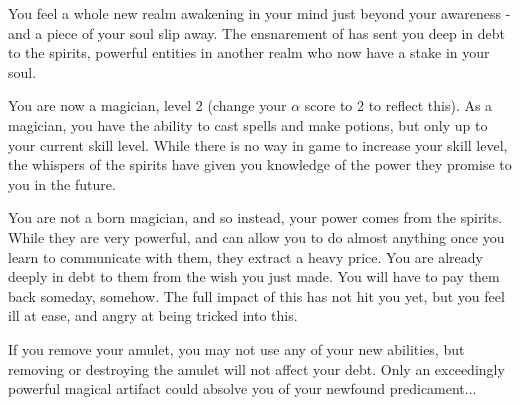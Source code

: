 \documentclass[green]{NeptuneBall}
\begin{document}
\name{\gSpirits{}}

You feel a whole new realm awakening in your mind just beyond your awareness - and a piece of your soul slip away. The ensnarement of \cWitch{} has sent you deep in debt to the spirits, powerful entities in another realm who now have a stake in your soul.

You are now a magician, level 2 (change your $\alpha$ score to 2 to reflect this). As a magician, you have the ability to cast spells and make potions, but only up to your current skill level. While there is no way in game to increase your skill level, the whispers of the spirits have given you knowledge of the power they promise to you in the future.

You are not a born magician, and so instead, your power comes from the spirits. While they are very powerful, and can allow you to do almost anything once you learn to communicate with them, they extract a heavy price. You are already deeply in debt to them from the wish you just made. You will have to pay them back someday, somehow. The full impact of this has not hit you yet, but you feel ill at ease, and angry at being tricked into this.

If you remove your amulet, you may not use any of your new abilities, but removing or destroying the amulet will not affect your debt. Only an exceedingly powerful magical artifact could absolve you of your newfound predicament...
\end{document}
